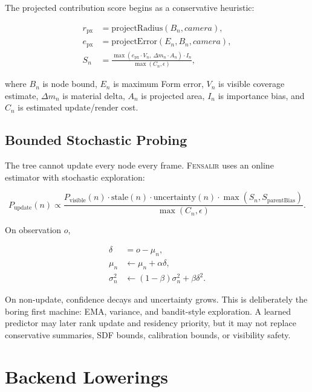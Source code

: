 \documentclass[11pt]{article}
\newcommand{\Fensalir}{\textsc{Fensalir}}
\begin{document}
The projected contribution score begins as a conservative heuristic:

\begin{align}
  r_{\mathrm{px}} &= \mathrm{projectRadius}(B_n, camera),\\
  e_{\mathrm{px}} &= \mathrm{projectError}(E_n, B_n, camera),\\
  S_n &= \frac{
      \max(e_{\mathrm{px}}\cdot V_n,\ \Delta m_n\cdot A_n)
      \cdot I_n
    }{\max(C_n,\epsilon)},
\end{align}

where \(B_n\) is node bound, \(E_n\) is maximum Form error, \(V_n\) is visible
coverage estimate, \(\Delta m_n\) is material delta, \(A_n\) is projected area,
\(I_n\) is importance bias, and \(C_n\) is estimated update/render cost.

\subsection{Bounded Stochastic Probing}

The tree cannot update every node every frame.  \Fensalir{} uses an online
estimator with stochastic exploration:

\begin{equation}
  P_{\mathrm{update}}(n) \propto
  \frac{
    P_{\mathrm{visible}}(n)
    \cdot \mathrm{stale}(n)
    \cdot \mathrm{uncertainty}(n)
    \cdot \max(S_n, S_{\mathrm{parentBias}})
  }{\max(C_n,\epsilon)}.
\end{equation}

On observation \(o\),

\begin{align}
  \delta &= o - \mu_n,\\
  \mu_n &\leftarrow \mu_n + \alpha \delta,\\
  \sigma_n^2 &\leftarrow (1-\beta)\sigma_n^2 + \beta\delta^2.
\end{align}

On non-update, confidence decays and uncertainty grows.  This is deliberately
the boring first machine: EMA, variance, and bandit-style exploration.  A
learned predictor may later rank update and residency priority, but it may not
replace conservative summaries, SDF bounds, calibration bounds, or visibility
safety.

\section{Backend Lowerings}
\end{document}
